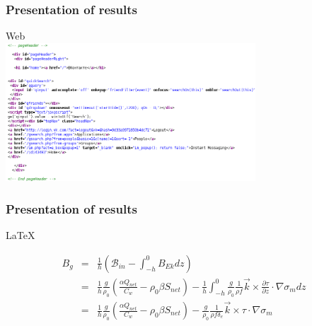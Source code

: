 \documentclass{beamer}
\begin{document}
\begin{frame}[fragile]
\frametitle{Presentation of results} 
\begin{center}
Web\\
\includegraphics[width=0.7\textwidth,angle=00]{vkontakte1.png}\end{center}
\end{frame}

\begin{frame}[fragile]
\frametitle{Presentation of results}
\begin{center}
\LaTeX{}\\
\begin{example}
\end{example}

\begin{example}
\begin{eqnarray}
B_g &=& \frac{1}{h}\left( \mathcal{B}_{in} - \int_{-h}^0B_{Ek}dz \right) \nonumber \\
&=& \frac{1}{h}\frac{g}{\rho_0}\left( \frac{\alpha Q_{net}}{C_w} - \rho_0 \beta S_{net}\right)
- \frac{1}{h}\int_{-h}^0
\frac{g}{\rho_0}\frac{1}{\rho f}\vec{k}\times \frac{\partial \tau}{\partial z} \cdot\nabla\sigma_m dz
\nonumber \\
&=& \frac{1}{h}\frac{g}{\rho_0}\left( \frac{\alpha Q_{net}}{C_w} - \rho_0 \beta S_{net}\right)
- \frac{g}{\rho_0}\frac{1}{\rho f \delta_e}\vec{k}\times\tau\cdot\nabla\sigma_m
\end{eqnarray} 
\end{example}

\end{center}
\end{frame}
\end{document}
